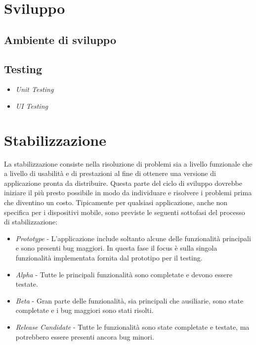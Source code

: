 \section{Sviluppo}
\subsection{Ambiente di sviluppo}
\subsection{Testing}
\begin{itemize}
    \item \textit{Unit Testing}
    \item \textit{UI Testing}
\end{itemize}

\section{Stabilizzazione}
La stabilizzazione consiste nella risoluzione di problemi sia a livello funzionale che a livello di usabilità e di prestazioni al fine di ottenere una versione di applicazione pronta da distribuire. Questa parte del ciclo di sviluppo dovrebbe iniziare il più presto possibile in modo da individuare e risolvere i problemi prima che diventino un costo. Tipicamente per qualsiasi applicazione, anche non specifica per i dispositivi mobile, sono previste le seguenti sottofasi del processo di stabilizzazione\cite{sdlf}:
\begin{itemize}
    \item \textit{Prototype} - L'applicazione include soltanto alcune delle funzionalità principali e sono presenti bug maggiori. In questa fase il focus è sulla singola funzionalità implementata fornita dal prototipo per il testing.
    \item \textit{Alpha} - Tutte le principali funzionalità sono completate e devono essere testate.
    \item \textit{Beta} - Gran parte delle funzionalità, sia principali che ausiliarie, sono state completate e i bug maggiori sono stati risolti.
    \item \textit{Release Candidate} - Tutte le funzionalità sono state completate e testate, ma potrebbero essere presenti ancora bug minori.
\end{itemize}

